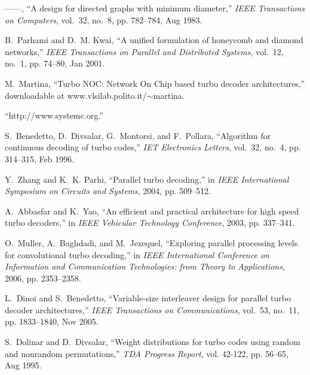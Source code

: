 \documentclass[10pt,twocolumn,journal]{IEEEtran}
\begin{document}
\begin{thebibliography}{10}
------, ``A design for directed graphs with minimum diameter,'' \emph{IEEE
  Transactions on Computers}, vol.~32, no.~8, pp. 782--784, Aug 1983.

B.~Parhami and D.~M. Kwai, ``A unified formulation of honeycomb and diamond
  networks,'' \emph{IEEE Transactions on Parallel and Distributed Systems},
  vol.~12, no.~1, pp. 74--80, Jan 2001.

M.~Martina, ``{T}urbo {NOC}: {N}etwork {O}n {C}hip based turbo decoder
  architectures,'' downloadable at www.vlsilab.polito.it/$\sim$martina.

``http://www.systemc.org.''

S.~Benedetto, D.~Divsalar, G.~Montorsi, and F.~Pollara, ``Algorithm for
  continuous decoding of turbo codes,'' \emph{IET Electronics Letters},
  vol.~32, no.~4, pp. 314--315, Feb 1996.

Y.~Zhang and K.~K. Parhi, ``Parallel turbo decoding,'' in \emph{IEEE
  International Symposium on Circuits and Systems}, 2004, pp. 509--512.

A.~Abbasfar and K.~Yao, ``An efficient and practical architecture for high
  speed turbo decoders,'' in \emph{IEEE Vehicular Technology Conference}, 2003,
  pp. 337--341.

O.~Muller, A.~Baghdadi, and M.~Jezequel, ``Exploring parallel processing levels
  for convolutional turbo decoding,'' in \emph{IEEE International Conference on
  Information and Communication Technologies: from Theory to Applications},
  2006, pp. 2353--2358.

L.~Dinoi and S.~Benedetto, ``Variable-size interleaver design for parallel
  turbo decoder architectures,'' \emph{IEEE Transactions on Communications},
  vol.~53, no.~11, pp. 1833--1840, Nov 2005.

S.~Dolinar and D.~Divsalar, ``Weight distributions for turbo codes using random
  and nonrandom permutations,'' \emph{TDA Progress Report}, vol. 42-122, pp.
  56--65, Aug 1995.

\end{thebibliography}
\end{document}
